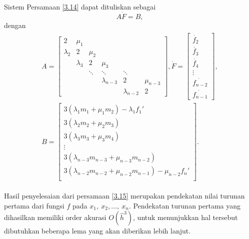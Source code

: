 Sistem Persamaan \eqref{3.14} dapat dituliskan sebagai
\begin{equation}\label{3.15}
    A\dot{F}=B,
\end{equation}
dengan
\begin{align}\label{3.16}
\begin{split}
    A=
    \begin{bmatrix}
        2 & \mu_1 \\
        \lambda_2 & 2 & \mu_2 \\
        & \lambda_3 & 2 & \mu_3 \\
        && \ddots & \ddots & \ddots \\
        &&&\lambda_{n-3} & 2 & \mu_{n-3} \\
        &&&&\lambda_{n-2} & 2
    \end{bmatrix},
    \dot{F}=
    \begin{bmatrix}
        \dot{f_2} \\
        \dot{f_3} \\
        \dot{f_4} \\
        \vdots \\
        \dot{f_{n-2}} \\
        \dot{f_{n-1}} 
    \end{bmatrix},\\
    B=
    \begin{bmatrix}
        3(\lambda_1m_1 + \mu_1m_2) - \lambda_1f_1' \\
        3(\lambda_{2}m_{2} + \mu_{2}m_3) \\
        3(\lambda_{3}m_{3} + \mu_{3}m_4) \\
        \vdots \\
        3(\lambda_{n-3}m_{n-3} + \mu_{n-3}m_{n-2}) \\
        3(\lambda_{n-2}m_{n-2} + \mu_{n-2}m_{n-1}) - \mu_{n-2}f_n' \\
    \end{bmatrix}.
\end{split}
\end{align}

Hasil penyelesaian dari persamaan \eqref{3.15} merupakan pendekatan nilai turunan pertama dari fungsi $f$ pada $x_1,~x_2,\dots,~x_n$. Pendekatan turunan pertama yang dihasilkan memiliki order akurasi $O(\hat{h}^3)$, untuk menunjukkan hal tersebut dibutuhkan beberapa lema yang akan diberikan lebih lanjut.

